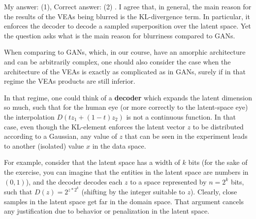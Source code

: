 \documentclass{article}
\newcommand{\inb}[1]{ \color{blue}#1 \color{black} }
\begin{document}
\inb{ My answer: (1), Correct answer: (2)}. 
I agree that, in general, the main reason for the results of the VEAs being blurred is the KL-divergence term. In particular, it enforces the decoder to decode a sampled superposition over the latent space. Yet the question asks what is the main reason for blurriness compared to GANs.

When comparing to GANs, which, in our course, have an amorphic architecture and can be arbitrarily complex, one should also consider the case when the architecture of the VEAs is exactly as complicated as in GANs, surely if in that regime the VEAs products are still inferior.

In that regime, one could think of a \textbf{decoder} which expands the latent dimension so much, such that for the human eye (or more correctly to the latent-space eye) the interpolation $D(tz_{1} + (1-t)z_{2})$ is not a continuous function. In that case, even though the KL-element enforces the latent vector $z$ to be distributed according to a Gaussian, any value of $z$ that can be seen in the experiment leads to another (isolated) value $x$ in the data space.

For example, consider that the latent space has a width of $k$ bits (for the sake of the exercise, you can imagine that the entities in the latent space are numbers in $(0,1)$), and the decoder decodes each $z$ to a space represented by $n = 2^{k}$ bits, such that $D(z) = 2^{ z * 2^{k} }$ (shifting by the integer suitable to $z$). Clearly, close samples in the latent space get far in the domain space. That argument cancels any justification due to behavior or penalization in the latent space.

\end{document}
